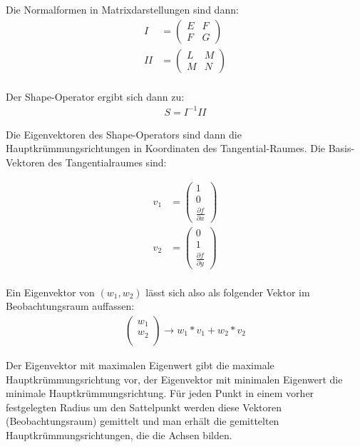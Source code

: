 \documentclass[a4paper, openany, oneside]{memoir}
\begin{document}
Die Normalformen in Matrixdarstellungen sind dann:
\begin{align}
I &=
\begin{pmatrix}
E & F \\
F & G 
\end{pmatrix} \\
II &=
\begin{pmatrix}
L & M \\
M & N 
\end{pmatrix} \\
\end{align}  

Der Shape-Operator ergibt sich dann zu:
\begin{align}
S = I^{-1}II
\end{align} 

Die Eigenvektoren des Shape-Operators sind dann die Hauptkrümmungsrichtungen in Koordinaten des Tangential-Raumes. Die Basis-Vektoren des Tangentialraumes sind:

\begin{align}
v_1 &= \begin{pmatrix}
1 \\
0 \\
\frac{\partial f}{\partial x}
\end{pmatrix} \\
v_2 &= \begin{pmatrix}
0 \\
1 \\
\frac{\partial f}{\partial y}
\end{pmatrix} \\
\end{align} 

Ein Eigenvektor von \((w_1,w_2)\) lässt sich also als folgender Vektor im Beobachtungsraum auffassen:
\begin{align}
\begin{pmatrix}
w_1 \\
w_2 \\
\end{pmatrix} \rightarrow w_1*v_1+w_2*v_2
\end{align} 

Der Eigenvektor mit maximalen Eigenwert gibt die maximale Hauptkrümmungsrichtung vor, der Eigenvektor mit minimalen Eigenwert die minimale Hauptkrümmungsrichtung. Für jeden Punkt in einem vorher festgelegten Radius um den Sattelpunkt werden diese Vektoren (Beobachtungsraum) gemittelt und man erhält die gemittelten Hauptkrümmungsrichtungen, die die Achsen bilden.
\end{document}
